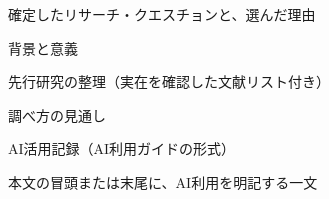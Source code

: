 
\begin{checks}
  \item 確定したリサーチ・クエスチョンと、選んだ理由
  \item 背景と意義
  \item 先行研究の整理（実在を確認した文献リスト付き）
  \item 調べ方の見通し
  \item AI活用記録（AI利用ガイドの形式）
  \item 本文の冒頭または末尾に、AI利用を明記する一文
\end{checks}
\aimemo

